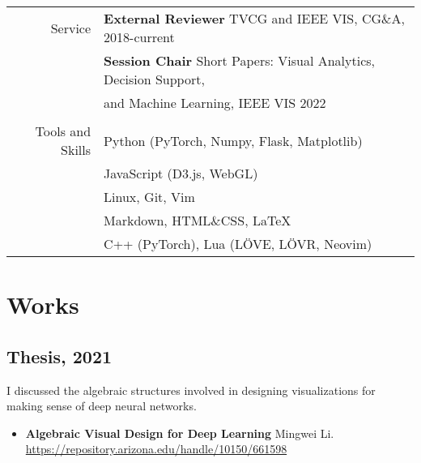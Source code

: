\documentclass[letterpaper,11pt,oneside]{article}
\begin{document}
\begin{tabular}{@{} r l}
\Large{Service}
    & \textbf{External Reviewer} TVCG and IEEE VIS, CG\&A, 2018-current \\
    & \textbf{Session Chair} Short Papers: Visual Analytics, Decision Support, \\
    & and Machine Learning, IEEE VIS 2022\\
    
    \\
\Large{Tools and Skills}
    & Python (PyTorch, Numpy, Flask, Matplotlib) \\
    & JavaScript (D3.js, WebGL) \\
    & Linux, Git, Vim \\
    & Markdown, HTML\&CSS, \LaTeX \\
    & C++ (PyTorch), Lua (LÖVE, LÖVR, Neovim) \\ 

\end{tabular}

\pagebreak

\section*{Works}

\subsection*{Thesis, 2021}
I discussed the algebraic structures involved in designing visualizations for making sense of deep neural networks.
    \begin{itemize}
        \item \textbf{Algebraic Visual Design for Deep Learning} Mingwei Li. \url{https://repository.arizona.edu/handle/10150/661598}
    \end{itemize}
\end{document}
